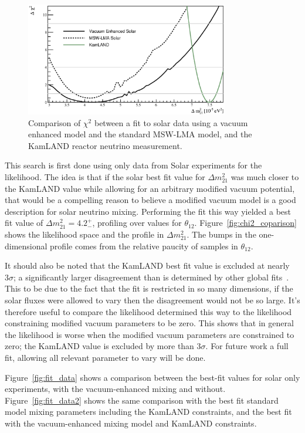 \begin{figure}[htbp]
\centering
\includegraphics[width=0.79\textwidth]{dm21_compare}
\caption[Modified Vacuum Mixing $\chi^{2}$ Profile]{
Comparison of $\chi^{2}$ between a fit to solar data
using a vacuum enhanced model and the standard MSW-LMA
model, and the KamLAND reactor neutrino measurement.}
\label{fig:chi2_comparison}
\end{figure}

This search is first done using only data from Solar experiments for the
likelihood.
The idea is that if the solar best fit value for $\Delta m^{2}_{21}$ was much closer
to the KamLAND value while allowing for an arbitrary modified vacuum potential,
that would be a compelling reason to believe a modified vacuum model is a
good description for solar neutrino mixing.
Performing the fit this way yielded a best fit value
of $\Delta m^{2}_{21}=4.2^{+}_{-}$, profiling over values for $\theta_{12}$.
Figure~\ref{fig:chi2_coparison} shows the likelihood space and the profile in $\Delta m^{2}_{21}$.
The bumps in the one-dimensional profile comes from the relative paucity
of samples in $\theta_{12}$.

It should also be noted that the KamLAND best fit value is excluded at nearly
$3\sigma$;
a significantly larger disagreement than is determined by other global fits~\cite{nu_fit}.
This to be due to the fact that the fit is restricted in so
many dimensions, if the solar fluxes were allowed to vary then the disagreement
would not be so large.
It's therefore useful to compare the likelihood determined this way to the
likelihood constraining modified vacuum parameters to be zero.
This shows that in general the likelihood is worse when the modified
vacuum parameters are constrained to zero;
the KamLAND value is excluded by more than $3\sigma$.
For future work a full fit, allowing all relevant parameter to vary will be done.

Figure~\ref{fig:fit_data} shows a  comparison between the best-fit values
for solar only experiments, with the vacuum-enhanced mixing and without.
Figure~\ref{fig:fit_data2} shows the same comparison with the
best fit standard model mixing parameters including the KamLAND constraints,
and the best fit with the vacuum-enhanced mixing model and KamLAND constraints.


